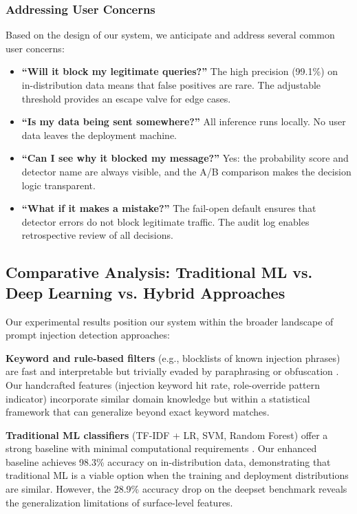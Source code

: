 \documentclass[12pt, letterpaper]{article}   %
\begin{document}
\subsubsection{Addressing User Concerns}

Based on the design of our system, we anticipate and address several common user concerns:

\begin{itemize}
    \item \textbf{``Will it block my legitimate queries?''} The high precision (99.1\%) on in-distribution data means that false positives are rare. The adjustable threshold provides an escape valve for edge cases.
    \item \textbf{``Is my data being sent somewhere?''} All inference runs locally. No user data leaves the deployment machine.
    \item \textbf{``Can I see why it blocked my message?''} Yes: the probability score and detector name are always visible, and the A/B comparison makes the decision logic transparent.
    \item \textbf{``What if it makes a mistake?''} The fail-open default ensures that detector errors do not block legitimate traffic. The audit log enables retrospective review of all decisions.
\end{itemize}


\subsection{Comparative Analysis: Traditional ML vs. Deep Learning vs. Hybrid Approaches}

Our experimental results position our system within the broader landscape of prompt injection detection approaches:

\textbf{Keyword and rule-based filters} (e.g., blocklists of known injection phrases) are fast and interpretable but trivially evaded by paraphrasing or obfuscation \cite{ref29}\cite{ref30}. Our handcrafted features (injection keyword hit rate, role-override pattern indicator) incorporate similar domain knowledge but within a statistical framework that can generalize beyond exact keyword matches.

\textbf{Traditional ML classifiers} (TF-IDF + LR, SVM, Random Forest) offer a strong baseline with minimal computational requirements \cite{ref33}\cite{ref1}\cite{ref27}. Our enhanced baseline achieves 98.3\% accuracy on in-distribution data, demonstrating that traditional ML is a viable option when the training and deployment distributions are similar. However, the 28.9\% accuracy drop on the deepset benchmark reveals the generalization limitations of surface-level features.
\end{document}
